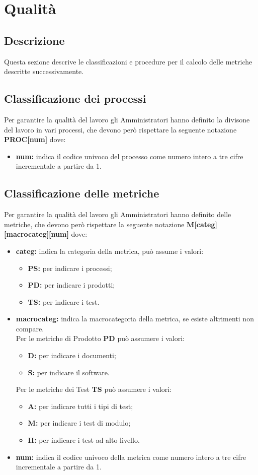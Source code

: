 \documentclass[NormeDiProgetto.tex]{subfiles}
\begin{document}
	
	\section{Qualità}
	\subsection{Descrizione}
	Questa sezione descrive le classificazioni e procedure per il calcolo delle metriche descritte successivamente.
	\subsection{Classificazione dei processi}
	Per garantire la qualità del lavoro gli Amministratori hanno definito la divisone del lavoro in vari processi, che devono però rispettare la seguente notazione \textbf{PROC[num]}	dove:
	\begin{itemize}
		\item \textbf{num:} indica il codice univoco del processo come numero intero a tre cifre incrementale a partire da 1.
	\end{itemize}	
	
	\subsection{Classificazione delle metriche}
	Per garantire la qualità del lavoro gli Amministratori hanno definito delle metriche, che devono però rispettare la seguente notazione \textbf{M[categ][macrocateg][num]}	dove:
	\begin{itemize}
		\item \textbf{categ:} indica la categoria della metrica, può assume i valori:
		\begin{itemize}
			\item \textbf{PS:} per indicare i processi;
			\item \textbf{PD:} per indicare i prodotti;
			\item \textbf{TS:} per indicare i test.
		\end{itemize}
		\item \textbf{macrocateg:} indica la macrocategoria della metrica, se esiste altrimenti non compare.\\
		Per le metriche di Prodotto \textbf{PD} può assumere i valori:
		\begin{itemize}
			\item \textbf{D:} per indicare i documenti;
			\item \textbf{S:} per indicare il software.
		\end{itemize}
		Per le metriche dei Test \textbf{TS} può assumere i valori:
		\begin{itemize}
			\item \textbf{A:} per indicare tutti i tipi di test;
			\item \textbf{M:} per indicare i test di modulo;
			\item \textbf{H:} per indicare i test ad alto livello.		
		\end{itemize}
		\item \textbf{num:} indica il codice univoco della metrica come numero intero a tre cifre incrementale a partire da 1.
	\end{itemize}	
	
\end{document}
